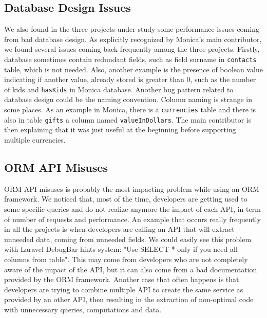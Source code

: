 \documentclass[sigconf]{acmart}
\begin{document}
\subsection{Database Design Issues}
We also found in the three projects under study some performance issues coming from bad database design. As explicitly recognized \cite{monicaticket204} by Monica's main contributor, we found several issues coming back frequently among the three projects. Firstly, database sometimes contain redundant fields, such as field surname in \texttt{contacts} table, which is not needed. Also, another example is the presence of boolean value indicating if another value, already stored is greater than 0, such as the number of kids and \texttt{hasKids} in Monica database. Another bug pattern related to database design could be the naming convention. Column naming is strange in some places. As an example in Monica, there is a \texttt{currencies} table and there is also in table \texttt{gifts} a column named \texttt{valueInDollars}. The main contributor is then explaining that it was just useful at the beginning before supporting multiple currencies.

\subsection{ORM API Misuses}
ORM API misuses is probably the most impacting problem while using an ORM framework. We noticed that, most of the time, developers are getting used to some specific queries and do not realize anymore the impact of each API, in term of number of requests and performance. An example that occurs really frequently in all the projects is when developers are calling an API that will extract unneeded data, coming from unneeded fields. We could easily see this problem with Laravel DebugBar hints system: "Use SELECT * only if you need all columns from table". This may come from developers who are not completely aware of the impact of the API, but it can also come from a bad documentation provided by the ORM framework. Another case that often happens is that developers are trying to combine multiple API to create the same service as provided by an other API, then resulting in the extraction of non-optimal code with unnecessary queries, computations and data.
\end{document}
